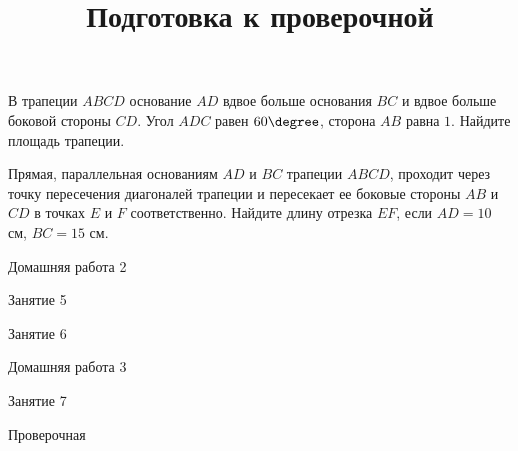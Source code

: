 \begin{class}[number=4]
\begin{listofex}
		\item В трапеции \( ABCD \) основание \( AD \) вдвое больше основания \( BC \) и вдвое больше боковой стороны \( CD \). Угол \( ADC \) равен \( 60\degree \), сторона \( AB \) равна \( 1 \). Найдите площадь трапеции.
		\item Прямая, параллельная основаниям \( AD \) и \( BC \) трапеции \( ABCD \), проходит через точку пересечения диагоналей трапеции и пересекает ее боковые стороны \( AB \) и \( CD \) в точках \( E \) и \( F \) соответственно. Найдите длину отрезка \( EF \), если \( AD=10 \) см, \( BC=15 \) см.
	\end{listofex}
\end{class}

\begin{homework}[number=2]
	\begin{listofex}
		\item Домашняя работа 2
	\end{listofex}
\end{homework}

\begin{class}[number=5]
	\begin{listofex}
		\item Занятие 5
	\end{listofex}
\end{class}

\begin{class}[number=6]
	\begin{listofex}
		\item Занятие 6
	\end{listofex}
\end{class}

\begin{homework}[number=3]
	\begin{listofex}
		\item Домашняя работа 3
	\end{listofex}
\end{homework}

\begin{class}[number=7]
	\title{Подготовка к проверочной}
	\begin{listofex}
		\item Занятие 7
	\end{listofex}
\end{class}

\begin{exam}
	\begin{listofex}
		\item Проверочная
	\end{listofex}
\end{exam}
